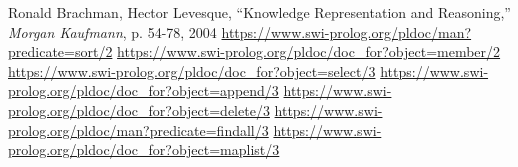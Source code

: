 \documentclass{article}
\begin{document}
\newpage

\begin{thebibliography}{1.7} 
	 \color{cyan}Ronald Brachman, Hector Levesque, “Knowledge Representation and Reasoning,” \textit{Morgan Kaufmann}, p. 54-78, 2004
	 \url{https://www.swi-prolog.org/pldoc/man?predicate=sort/2}
	 \url{https://www.swi-prolog.org/pldoc/doc_for?object=member/2}
	 \url{https://www.swi-prolog.org/pldoc/doc_for?object=select/3}
	 \url{https://www.swi-prolog.org/pldoc/doc_for?object=append/3}
	 \url{https://www.swi-prolog.org/pldoc/doc_for?object=delete/3}
	 \url{https://www.swi-prolog.org/pldoc/man?predicate=findall/3}
	 \url{https://www.swi-prolog.org/pldoc/doc_for?object=maplist/3}
\end{thebibliography}

\newpage

\end{document}
